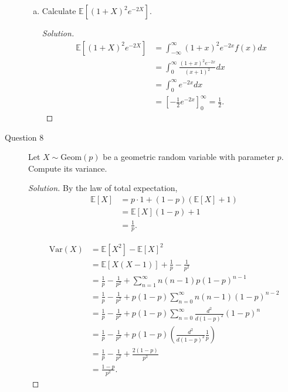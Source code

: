 \documentclass[addpoints, 11pt]{exam}
\newcommand*{\E}{\mathds{E}}
\begin{document}
\begin{description}
\begin{enumerate}[(a)]
        \item Calculate $\E[(1 + X)^2e^{-2X}]$.
        \begin{proof}[Solution]
            \begin{align*}
                \E[(1 + X)^2e^{-2X}]
                &= \int^{\infty}_{-\infty} (1 + x)^2e^{-2x}f(x) dx \\
                &= \int^{\infty}_{0} \frac{(1 + x)^2e^{-2x}}{(x+1)^2} dx \\
                &= \int^{\infty}_{0} e^{-2x} dx \\
                &= \left[-\frac{1}{2}e^{-2x}\right]^{\infty}_0 = \frac{1}{2}.
            \end{align*}
        \end{proof}
    \end{enumerate}

    \newpage

    \item[Question 8] Let $X \sim \text{Geom}(p)$ be a geometric random variable with parameter $p$. Compute its variance.

    \begin{proof}[Solution]
    By the law of total expectation,
        \begin{align*}
            \E[X] 
            &= p \cdot 1 + (1 - p)(\E[X] + 1) \\
            &= \E[X](1 - p) + 1 \\
            &= \frac{1}{p}.
        \end{align*}
        
        \begin{align*}
            \text{Var}(X)
            &= \E[X^2] - \E[X]^2 \\
            &= \E[X(X - 1)] + \frac{1}{p} - \frac{1}{p^2} \\
            &=  \frac{1}{p} - \frac{1}{p^2} + \sum^{\infty}_{n = 1} n(n - 1)p(1 - p)^{n - 1} \\
            &= \frac{1}{p} - \frac{1}{p^2} + p(1 - p)\sum^{\infty}_{n = 0} n(n - 1)(1 - p)^{n - 2} \\
            &= \frac{1}{p} - \frac{1}{p^2} + p(1 - p)\sum^{\infty}_{n = 0} \frac{d^2}{d(1 - p)^2}(1 - p)^{n} \\
            &= \frac{1}{p} - \frac{1}{p^2} + p(1 - p)\left(\frac{d^2}{d(1- 
            p)^2}\frac{1}{p}\right) \\
            &= \frac{1}{p} - \frac{1}{p^2} + \frac{2(1 - p)}{p^2} \\
            &= \frac{1 - p}{p^2}.
        \end{align*}
    \end{proof}
    
\end{description}
\end{document}
